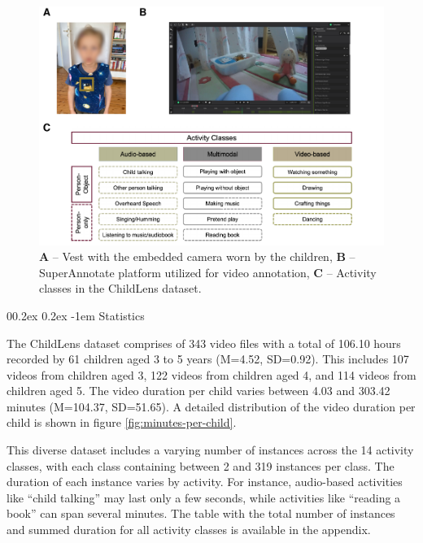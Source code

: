 \documentclass[
  man,floatsintext]{apa6}
\makeatletter
\let\oldparagraph\paragraph
\renewcommand{\paragraph}{
    \@ifstar
      \xxxParagraphStar
      \xxxParagraphNoStar
  }
\newcommand{\xxxParagraphStar}[1]{\oldparagraph*{#1}\mbox{}}
\newcommand{\xxxParagraphNoStar}[1]{\oldparagraph{#1}\mbox{}}
\renewcommand{\paragraph}{\@startsection{paragraph}{4}{\parindent}%
  {0\baselineskip \@plus 0.2ex \@minus 0.2ex}%
  {-1em}%
  {\normalfont\normalsize\bfseries\itshape\typesectitle}}
\makeatother
\begin{document}
\begin{figure}

{\centering \includegraphics{ChildLens_paper_files/figure-latex/camera-superannotate-activity-classes-1} 

}

\caption{\textbf{A} – Vest with the embedded camera worn by the children, \textbf{B} – SuperAnnotate platform utilized for video annotation, \textbf{C} – Activity classes in the ChildLens dataset.}\label{fig:camera-superannotate-activity-classes}
\end{figure}

\paragraph{Statistics}\label{statistics}

The ChildLens dataset comprises of 343 video files with a total of 106.10 hours recorded by 61 children aged 3 to 5 years (M=4.52, SD=0.92). This includes 107 videos from children aged 3, 122 videos from children aged 4, and 114 videos from children aged 5. The video duration per child varies between 4.03 and 303.42 minutes (M=104.37, SD=51.65). A detailed distribution of the video duration per child is shown in figure \ref{fig:minutes-per-child}.

This diverse dataset includes a varying number of instances across the 14 activity classes, with each class containing between 2 and 319 instances per class. The duration of each instance varies by activity. For instance, audio-based activities like ``child talking'' may last only a few seconds, while activities like ``reading a book'' can span several minutes. The table with the total number of instances and summed duration for all activity classes is available in the appendix.
\end{document}
